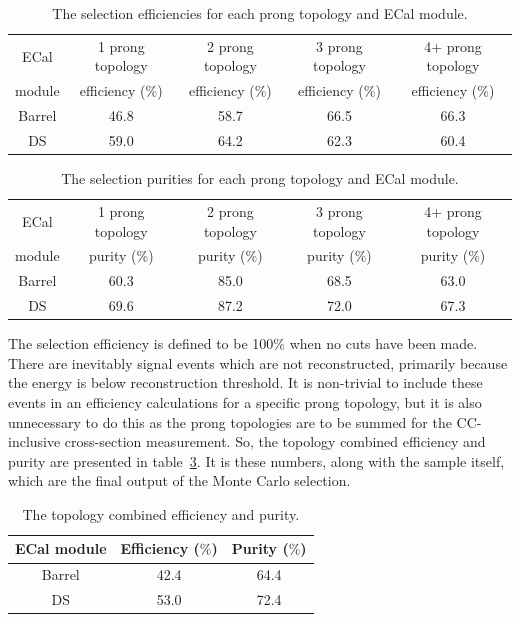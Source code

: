\begin{table}
  \begin{tabular}{ c c c c c }
    ECal & 1 prong topology & 2 prong topology & 3 prong topology & 4+ prong topology \\
    module & efficiency ($\%$)& efficiency ($\%$)& efficiency ($\%$)& efficiency ($\%$) \\ \hline \hline
    Barrel & 46.8 & 58.7 & 66.5 & 66.3 \\
    DS & 59.0 & 64.2 & 62.3 & 60.4\\
  \end{tabular}
  \caption{The selection efficiencies for each prong topology and ECal module.}
  \label{table:SelEfficiency}
\end{table}
\begin{table}
  \begin{tabular}{ c c c c c }
    ECal & 1 prong topology & 2 prong topology & 3 prong topology & 4+ prong topology \\
    module & purity ($\%$)& purity ($\%$)& purity ($\%$)& purity ($\%$) \\ \hline \hline
    Barrel & 60.3 & 85.0 & 68.5 & 63.0\\
    DS & 69.6 & 87.2 & 72.0 & 67.3\\
  \end{tabular}
  \caption{The selection purities for each prong topology and ECal module.}
  \label{table:SelPurity}
\end{table}
\newline
\newline
The selection efficiency is defined to be 100$\%$ when no cuts have been made.  There are inevitably signal events which are not reconstructed, primarily because the energy is below reconstruction threshold.  It is non-trivial to include these events in an efficiency calculations for a specific prong topology, but it is also unnecessary to do this as the prong topologies are to be summed for the CC-inclusive cross-section measurement.  So, the topology combined efficiency and purity are presented in table~\ref{table:FinalEffPur}.  It is these numbers, along with the sample itself, which are the final output of the Monte Carlo selection.
\begin{table}
  \begin{tabular}{ c c c}
    ECal module & Efficiency ($\%$) & Purity ($\%$) \\ \hline \hline
    Barrel & 42.4 & 64.4 \\
    DS & 53.0  & 72.4 \\
  \end{tabular}
  \caption{The topology combined efficiency and purity.}
  \label{table:FinalEffPur}
\end{table}





